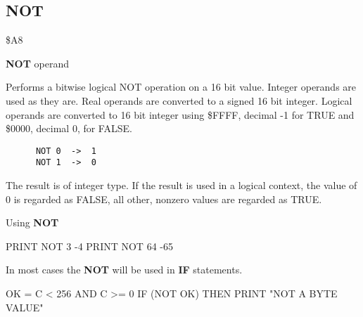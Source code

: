 
\newpage
\subsection{NOT}
\begin{description}[leftmargin=3cm,style=nextline]
\item [Token:] \$A8
\item [Format:] {\bf NOT} operand
\item [Usage:]  Performs a bitwise
                logical NOT operation on a 16 bit value.
                Integer operands are used as they are.
                Real operands are converted to a signed 16 bit integer.
                Logical operands are converted to 16 bit integer
                using \$FFFF, decimal -1 for TRUE
                and \$0000, decimal 0, for FALSE.

   \begin{verbatim}
      NOT 0  ->  1
      NOT 1  ->  0
   \end{verbatim}

\item [Remarks:] The result is of integer type.
                 If the result is used in a logical context,
                 the value of 0 is regarded as FALSE,
                 all other, nonzero values are regarded as TRUE.
\item [Example:] Using {\bf NOT}

\begin{screenoutput}
  PRINT NOT 3
  -4
  PRINT NOT 64
  -65
\end{screenoutput}

In most cases the {\bf NOT} will be used in {\bf IF} statements.

\begin{screenoutput}
   OK = C < 256 AND C >= 0
   IF (NOT OK) THEN PRINT "NOT A BYTE VALUE"
\end{screenoutput}
\end{description}


\newpage
